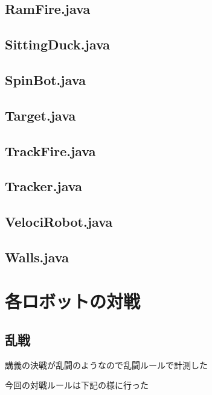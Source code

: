 \documentclass[12pt]{jarticle} %
\begin{document}
\begin{flushleft}
\subsection{RamFire.java}

\newpage

\subsection{SittingDuck.java}

\newpage


\subsection{SpinBot.java}

\newpage

\subsection{Target.java}

\newpage

\subsection{TrackFire.java}

\newpage

\subsection{Tracker.java}

\newpage

\subsection{VelociRobot.java}

\newpage

\subsection{Walls.java}

\newpage


\section{各ロボットの対戦}

\subsection{乱戦}

\item 講義の決戦が乱闘のようなので乱闘ルールで計測した
\item 今回の対戦ルールは下記の様に行った


\end{flushleft}
\end{document}
